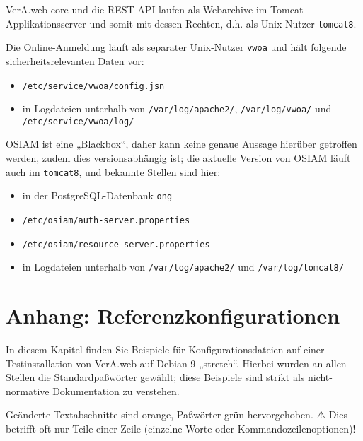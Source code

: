 \documentclass{tarentanleitung}
\begin{document}
VerA.web core und die REST-API laufen als Webarchive im
Tomcat-Applikationsserver und somit mit dessen Rechten,
d.h. als Unix-Nutzer \texttt{tomcat8}.

Die Online-Anmeldung läuft als separater Unix-Nutzer \texttt{vwoa}
und hält folgende sicherheitsrelevanten Daten vor:\keinumbruch

\begin{itemize}
 \item{\texttt{/etc/service/vwoa/config.jsn}}
 \item{in Logdateien unterhalb von \texttt{/var/log/apache2/},
  \texttt{/var/log/vwoa/} und \texttt{/etc/service/vwoa/log/}}
\end{itemize}

OSIAM ist eine „Blackbox“, daher kann keine genaue Aussage hierüber getroffen
werden, zudem dies versionsabhängig ist; die aktuelle Version von OSIAM läuft
auch im \texttt{tomcat8}, und bekannte Stellen sind hier:\keinumbruch

\begin{itemize}
 \item{in der PostgreSQL-Datenbank \texttt{ong}}
 \item{\texttt{/etc/osiam/auth-server.properties}}
 \item{\texttt{/etc/osiam/resource-server.properties}}
 \item{in Logdateien unterhalb von \texttt{/var/log/apache2/}
  und \texttt{/var/log/tomcat8/}}
\end{itemize}

\section{Anhang: Referenzkonfigurationen}\label{sec:refcfg}

In diesem Kapitel finden Sie Beispiele für Konfigurationsdateien
auf einer Testinstallation von VerA.web auf Debian 9 „stretch“.
Hierbei wurden an allen Stellen die Standardpaßwörter gewählt;
diese Beispiele sind strikt als nicht-normative Dokumentation
zu verstehen.


{\color{RedOrange} Geänderte Textabschnitte} sind orange,
{\color{ForestGreen} Paßwörter} grün hervorgehoben. ⚠ Dies
betrifft oft nur Teile einer Zeile (einzelne Worte oder
Kommandozeilenoptionen)!
\end{document}
